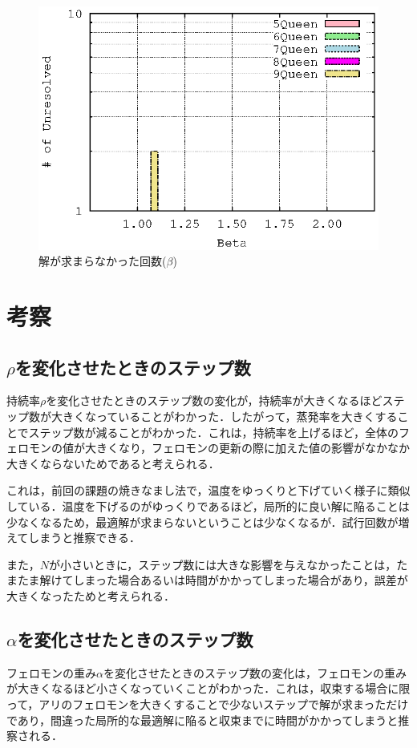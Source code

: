 \documentclass{jarticle}
\begin{document}
\begin{figure}[H]
\begin{center}
	\includegraphics[width=120mm]{image/unresolved_beta.eps}
	\caption{解が求まらなかった回数($\beta$)}
	\label{fig:unres_beta}
\end{center}
\end{figure}




\section{考察}
\subsection{$\rho$を変化させたときのステップ数}
\label{sec:think_rho}
持続率$\rho$を変化させたときのステップ数の変化が，持続率が大きくなるほどステップ数が大きくなっていることがわかった．したがって，蒸発率を大きくすることでステップ数が減ることがわかった．これは，持続率を上げるほど，全体のフェロモンの値が大きくなり，フェロモンの更新の際に加えた値の影響がなかなか大きくならないためであると考えられる．

これは，前回の課題の焼きなまし法で，温度をゆっくりと下げていく様子に類似している．温度を下げるのがゆっくりであるほど，局所的に良い解に陥ることは少なくなるため，最適解が求まらないということは少なくなるが．試行回数が増えてしまうと推察できる．

また，$N$が小さいときに，ステップ数には大きな影響を与えなかったことは，たまたま解けてしまった場合あるいは時間がかかってしまった場合があり，誤差が大きくなったためと考えられる．


\subsection{$\alpha$を変化させたときのステップ数}
\label{sec:think_alpha}
フェロモンの重み$\alpha$を変化させたときのステップ数の変化は，フェロモンの重みが大きくなるほど小さくなっていくことがわかった．これは，収束する場合に限って，アリのフェロモンを大きくすることで少ないステップで解が求まっただけであり，間違った局所的な最適解に陥ると収束までに時間がかかってしまうと推察される．
\end{document}
